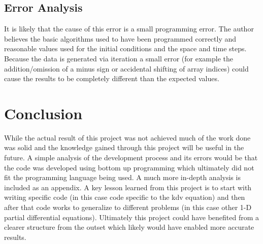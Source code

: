 \documentclass{article}
\begin{document}
\subsection{Error Analysis}
It is likely that the cause of this error is a small programming error. The
author believes the basic algorithms used to have been programmed correctly and
reasonable values used for the initial conditions and the space and time
steps. Because the data is generated via iteration a small error (for example
the addition/omission of a minus sign or accidental shifting of array indices)
could cause the results to be completely different than the expected values.
\section{Conclusion}
While the actual result of this project was not achieved much of the
work done was solid and the knowledge gained through this project will
be useful in the future. A simple analysis of the development process
and its errors would be that the code was developed using bottom up
programming which ultimately did not fit the programming language
being used. A much more in-depth analysis is included as an
appendix. A key lesson learned from this project is to start with
writing specific code (in this case code specific to the kdv equation)
and then after that code works to generalize to different problems (in
this case other 1-D partial differential equations). Ultimately this
project could have benefited from a clearer structure from the outset
which likely would have enabled more accurate results.
\pagebreak
\end{document}
